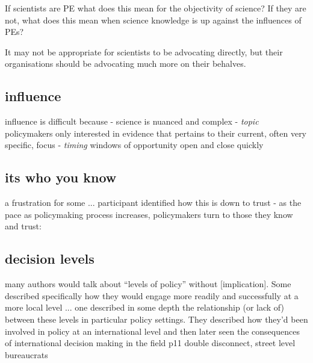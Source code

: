 If scientists are PE what does this mean for the objectivity of science?
If they are not, what does this mean when science knowledge is up against the influences of PEs?


It may not be appropriate for scientists to be advocating directly, but their organisations should be advocating much more on their behalves.


\subsection{influence}
influence is difficult because
- \emph{} science is nuanced and complex
- \emph{topic} policymakers only interested in evidence that pertains to their current, often very specific, focus
- \emph{timing} windows of opportunity open and close quickly

\subsection{its who you know}
a frustration for some ...
participant identified how this is down to trust - as the pace as policymaking process increases, policymakers turn to those they know and trust: 

\subsection{decision levels}
many authors would talk about ``levels of policy'' without [implication]. Some described specifically how they would engage more readily and successfully at a more local level ... one described in some depth the relationship (or lack of) between these levels in particular policy settings. They described how they'd been involved in policy at an international level and then later seen the consequences of international decision making in the field p11 double disconnect, street level bureaucrats

